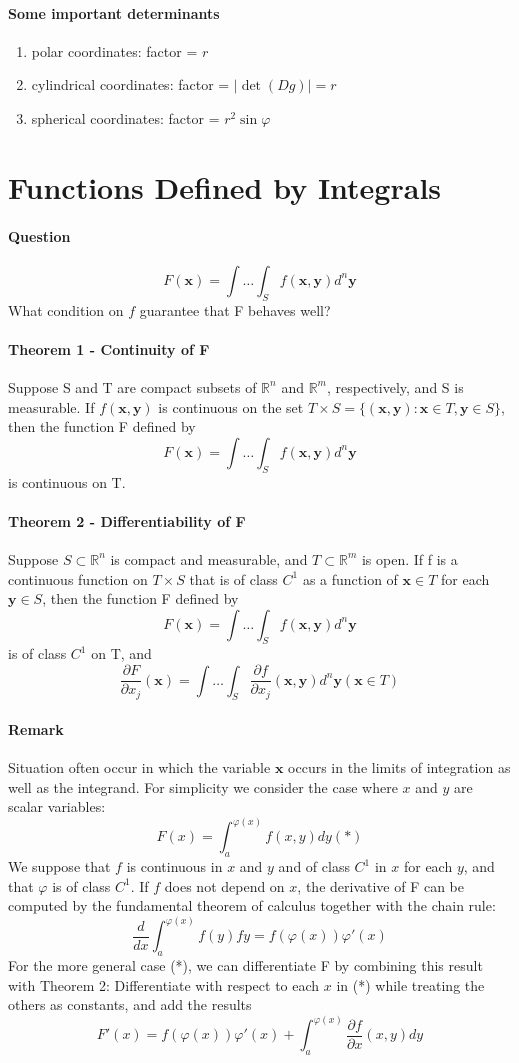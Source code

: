 \documentclass[11pt]{article}
\newcommand{\tb}[1]{\textbf{#1}}
\newcommand{\real}[0]{\mathbb{R}}
\newcommand{\vx}[0]{\tb{x}}
\newcommand{\vy}[0]{\tb{y}}
\begin{document}
\paragraph{Some important determinants}
\begin{enumerate}
    \item polar coordinates: factor = $r$
    \item cylindrical coordinates: factor = $|\det(Dg)| = r$
    \item spherical coordinates: factor = $r^2\sin\varphi$
\end{enumerate}

\section{Functions Defined by Integrals}
\paragraph{Question}  $$ F(\vx) = \int\hdots\int_S f(\vx,\vy)d^n\vy$$ What condition on $f$ guarantee that F behaves well?
\paragraph{Theorem 1 - Continuity of F} Suppose S and T are compact subsets of $\real^n$ and $\real^m$, respectively, and S is measurable. If $f(\vx, \vy)$ is continuous on the set $T \times S = \{(\vx, \vy): \vx \in T, \vy \in S\}$, then the function F defined by $$ F(\vx) = \int\hdots\int_S f(\vx,\vy)d^n\vy$$ is continuous on T.
\paragraph{Theorem 2 - Differentiability of F} Suppose $S \subset \real^n$ is compact and measurable, and $T \subset \real^m$ is open. If f is a continuous function on $T \times S$ that is of class $C^1$ as a function of $\vx \in T$ for each $\vy \in S$, then the function F defined by $$ F(\vx) = \int\hdots\int_S f(\vx,\vy)d^n\vy$$ is of class $C^1$ on T, and 
    $$ \frac{\partial F}{\partial x_j}(\vx) = \int \hdots \int_S \frac{\partial f}{\partial x_j}(\vx, \vy) d^n\vy (\vx \in T)$$
\paragraph{Remark} Situation often occur in which the variable $\vx$ occurs in the limits of integration as well as the integrand. For simplicity we consider the case where $x$ and $y$ are scalar variables: $$F(x) = \int_a^{\varphi(x)} f(x,y)dy (*)$$
We suppose that $f$ is continuous in $x$ and $y$ and of class $C^1$ in $x$ for each $y$, and that $\varphi$ is of class $C^1$. If $f$ does not depend on $x$, the derivative of F can be computed by the fundamental theorem of calculus together with the chain rule:
$$\frac{d}{dx}\int_a^{\varphi(x)}f(y)fy = f(\varphi(x))\varphi'(x)$$
For the more general case (*), we can differentiate F by combining this result with Theorem 2: Differentiate with respect to each $x$ in (*) while treating the others as constants, and add the results
$$F'(x) = f(\varphi(x))\varphi'(x) + \int_a^{\varphi(x)}\frac{\partial f}{\partial x}(x,y) dy$$
\end{document}
